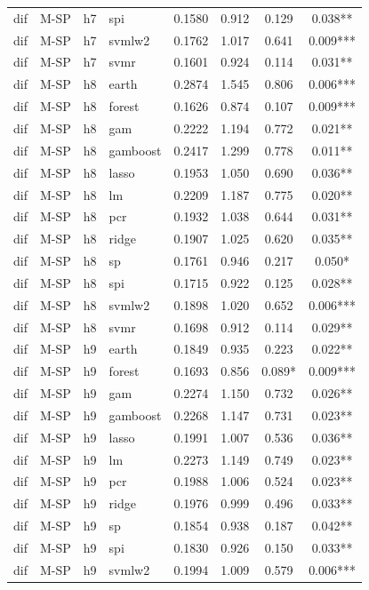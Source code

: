 \begin{ThreePartTable}
\begin{longtable}[t]{llclcccc}
dif & M-SP & h7 & spi & 0.1580 & 0.912 & 0.129 & 0.038**\\
dif & M-SP & h7 & svmlw2 & 0.1762 & 1.017 & 0.641 & 0.009***\\
dif & M-SP & h7 & svmr & 0.1601 & 0.924 & 0.114 & 0.031**\\
\addlinespace
dif & M-SP & h8 & earth & 0.2874 & 1.545 & 0.806 & 0.006***\\
dif & M-SP & h8 & forest & 0.1626 & 0.874 & 0.107 & 0.009***\\
dif & M-SP & h8 & gam & 0.2222 & 1.194 & 0.772 & 0.021**\\
dif & M-SP & h8 & gamboost & 0.2417 & 1.299 & 0.778 & 0.011**\\
dif & M-SP & h8 & lasso & 0.1953 & 1.050 & 0.690 & 0.036**\\
dif & M-SP & h8 & lm & 0.2209 & 1.187 & 0.775 & 0.020**\\
dif & M-SP & h8 & pcr & 0.1932 & 1.038 & 0.644 & 0.031**\\
dif & M-SP & h8 & ridge & 0.1907 & 1.025 & 0.620 & 0.035**\\
dif & M-SP & h8 & sp & 0.1761 & 0.946 & 0.217 & 0.050*\\
dif & M-SP & h8 & spi & 0.1715 & 0.922 & 0.125 & 0.028**\\
dif & M-SP & h8 & svmlw2 & 0.1898 & 1.020 & 0.652 & 0.006***\\
dif & M-SP & h8 & svmr & 0.1698 & 0.912 & 0.114 & 0.029**\\
\addlinespace
dif & M-SP & h9 & earth & 0.1849 & 0.935 & 0.223 & 0.022**\\
dif & M-SP & h9 & forest & 0.1693 & 0.856 & 0.089* & 0.009***\\
dif & M-SP & h9 & gam & 0.2274 & 1.150 & 0.732 & 0.026**\\
dif & M-SP & h9 & gamboost & 0.2268 & 1.147 & 0.731 & 0.023**\\
dif & M-SP & h9 & lasso & 0.1991 & 1.007 & 0.536 & 0.036**\\
dif & M-SP & h9 & lm & 0.2273 & 1.149 & 0.749 & 0.023**\\
dif & M-SP & h9 & pcr & 0.1988 & 1.006 & 0.524 & 0.023**\\
dif & M-SP & h9 & ridge & 0.1976 & 0.999 & 0.496 & 0.033**\\
dif & M-SP & h9 & sp & 0.1854 & 0.938 & 0.187 & 0.042**\\
dif & M-SP & h9 & spi & 0.1830 & 0.926 & 0.150 & 0.033**\\
dif & M-SP & h9 & svmlw2 & 0.1994 & 1.009 & 0.579 & 0.006***\\

\end{longtable}
\end{ThreePartTable}
